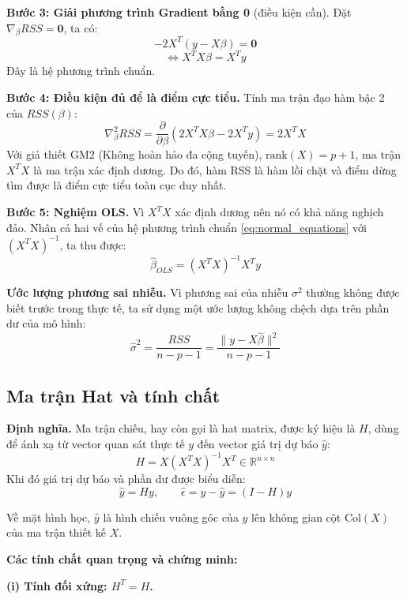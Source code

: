\documentclass[a4paper]{article}
\begin{document}
\textbf{Bước 3: Giải phương trình Gradient bằng 0} (điều kiện cần).
Đặt $\nabla_{\beta}RSS = \mathbf{0}$, ta có:
\[-2X^T(y - X\beta) = \mathbf{0}\]
\begin{equation}\label{eq:normal_equations}
\iff X^TX\beta = X^Ty
\end{equation}
Đây là hệ phương trình chuẩn.

\textbf{Bước 4: Điều kiện đủ để là điểm cực tiểu.}
Tính ma trận đạo hàm bậc 2 của $RSS(\beta)$:
\[\nabla^2_{\beta}RSS = \frac{\partial}{\partial \beta}(2X^TX\beta - 2X^Ty) = 2X^TX\]
Với giả thiết GM2 (Không hoàn hảo đa cộng tuyến), $\text{rank}(X) = p+1$, ma trận $X^TX$ là ma trận xác định dương. Do đó, hàm RSS là hàm lồi chặt và điểm dừng tìm được là điểm cực tiểu toàn cục duy nhất.

\textbf{Bước 5: Nghiệm OLS.}
Vì $X^TX$ xác định dương nên nó có khả năng nghịch đảo. Nhân cả hai vế của hệ phương trình chuẩn \eqref{eq:normal_equations} với $(X^TX)^{-1}$, ta thu được:
\begin{equation}
\hat{\beta}_{OLS} = (X^TX)^{-1}X^Ty
\end{equation}

\textbf{Ước lượng phương sai nhiễu.}
Vì phương sai của nhiễu $\sigma^2$ thường không được biết trước trong thực tế, ta sử dụng một ước lượng không chệch dựa trên phần dư của mô hình:
\begin{equation}
\hat{\sigma}^2 = \frac{RSS}{n - p - 1} = \frac{\lVert y - X\hat{\beta} \rVert^2}{n - p - 1}
\end{equation}

\subsection{Ma trận Hat và tính chất}

\textbf{Định nghĩa.} Ma trận chiếu, hay còn gọi là hat matrix, được ký hiệu là $H$, dùng để ánh xạ từ vector quan sát thực tế $y$ đến vector giá trị dự báo $\hat{y}$:
\begin{equation}
H = X(X^TX)^{-1}X^T \in \mathbb{R}^{n \times n}
\end{equation}
Khi đó giá trị dự báo và phần dư được biểu diễn:
\[\hat{y} = Hy, \qquad \hat{\epsilon} = y - \hat{y} = (I - H)y\]

Về mặt hình học, $\hat{y}$ là hình chiếu vuông góc của $y$ lên không gian cột $\text{Col}(X)$ của ma trận thiết kế $X$.

\textbf{Các tính chất quan trọng và chứng minh:}

\textbf{(i) Tính đối xứng: $H^T = H$.}
\end{document}
